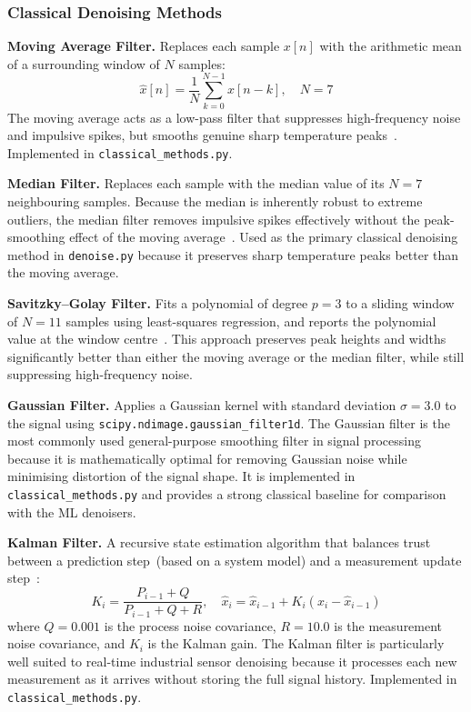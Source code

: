 \subsubsection*{Classical Denoising Methods}

\textbf{Moving Average Filter.} Replaces each sample $x[n]$ with the arithmetic mean of a surrounding window of $N$ samples:
\begin{equation}
\hat{x}[n] = \frac{1}{N}\sum_{k=0}^{N-1} x[n-k], \quad N = 7
\label{eq:ma}
\end{equation}
The moving average acts as a low-pass filter that suppresses high-frequency noise and impulsive spikes, but smooths genuine sharp temperature peaks~\cite{kalman_wavelet_denoising}. Implemented in \texttt{classical\_methods.py}.

\textbf{Median Filter.} Replaces each sample with the median value of its $N=7$ neighbouring samples. Because the median is inherently robust to extreme outliers, the median filter removes impulsive spikes effectively without the peak-smoothing effect of the moving average~\cite{kalman_wavelet_denoising}. Used as the primary classical denoising method in \texttt{denoise.py} because it preserves sharp temperature peaks better than the moving average.

\textbf{Savitzky--Golay Filter.} Fits a polynomial of degree $p=3$ to a sliding window of $N=11$ samples using least-squares regression, and reports the polynomial value at the window centre~\cite{savitzky1964smoothing}. This approach preserves peak heights and widths significantly better than either the moving average or the median filter, while still suppressing high-frequency noise.

\textbf{Gaussian Filter.} Applies a Gaussian kernel with standard deviation $\sigma=3.0$ to the signal using \texttt{scipy.ndimage.gaussian\_filter1d}. The Gaussian filter is the most commonly used general-purpose smoothing filter in signal processing because it is mathematically optimal for removing Gaussian noise while minimising distortion of the signal shape. It is implemented in \texttt{classical\_methods.py} and provides a strong classical baseline for comparison with the ML denoisers.

\textbf{Kalman Filter.} A recursive state estimation algorithm that balances trust between a prediction step~(based on a system model) and a measurement update step~\cite{kalman_wavelet_denoising}:
\begin{equation}
K_i = \frac{P_{i-1} + Q}{P_{i-1} + Q + R}, \quad
\hat{x}_i = \hat{x}_{i-1} + K_i(x_i - \hat{x}_{i-1})
\end{equation}
where $Q=0.001$ is the process noise covariance, $R=10.0$ is the measurement noise covariance, and $K_i$ is the Kalman gain. The Kalman filter is particularly well suited to real-time industrial sensor denoising because it processes each new measurement as it arrives without storing the full signal history. Implemented in \texttt{classical\_methods.py}.


